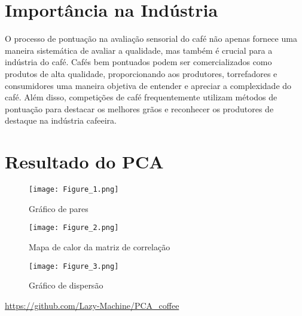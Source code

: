 \documentclass{article}
\begin{document}
\section{Importância na Indústria}

O processo de pontuação na avaliação sensorial do café não apenas fornece uma maneira sistemática de avaliar a qualidade, mas também é crucial para a indústria do café. Cafés bem pontuados podem ser comercializados como produtos de alta qualidade, proporcionando aos produtores, torrefadores e consumidores uma maneira objetiva de entender e apreciar a complexidade do café. Além disso, competições de café frequentemente utilizam métodos de pontuação para destacar os melhores grãos e reconhecer os produtores de destaque na indústria cafeeira.

\section{Resultado do PCA}

\begin{figure}[ht]
    \centering
    \texttt{[image: Figure\_1.png]}
    \caption{Gráfico de pares}
\end{figure}

\clearpage

\begin{figure}[ht]
    \centering
    \texttt{[image: Figure\_2.png]}
    \caption{Mapa de calor da matriz de correlação}
    \texttt{[image: Figure\_3.png]}
    \caption{Gráfico de dispersão}
\end{figure}

\begin{center}
    \url{https://github.com/Lazy-Machine/PCA_coffee}
\end{center}
\end{document}
